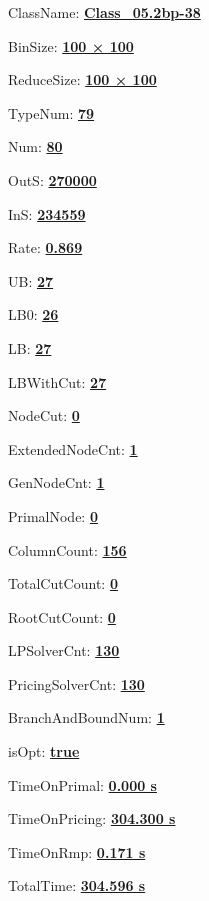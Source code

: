 \documentclass[11pt]{article}
\begin{document}
\pagestyle{empty}


ClassName: \underline{\textbf{Class_05.2bp-38}}
\par
BinSize: \underline{\textbf{100 × 100}}
\par
ReduceSize: \underline{\textbf{100 × 100}}
\par
TypeNum: \underline{\textbf{79}}
\par
Num: \underline{\textbf{80}}
\par
OutS: \underline{\textbf{270000}}
\par
InS: \underline{\textbf{234559}}
\par
Rate: \underline{\textbf{0.869}}
\par
UB: \underline{\textbf{27}}
\par
LB0: \underline{\textbf{26}}
\par
LB: \underline{\textbf{27}}
\par
LBWithCut: \underline{\textbf{27}}
\par
NodeCut: \underline{\textbf{0}}
\par
ExtendedNodeCnt: \underline{\textbf{1}}
\par
GenNodeCnt: \underline{\textbf{1}}
\par
PrimalNode: \underline{\textbf{0}}
\par
ColumnCount: \underline{\textbf{156}}
\par
TotalCutCount: \underline{\textbf{0}}
\par
RootCutCount: \underline{\textbf{0}}
\par
LPSolverCnt: \underline{\textbf{130}}
\par
PricingSolverCnt: \underline{\textbf{130}}
\par
BranchAndBoundNum: \underline{\textbf{1}}
\par
isOpt: \underline{\textbf{true}}
\par
TimeOnPrimal: \underline{\textbf{0.000 s}}
\par
TimeOnPricing: \underline{\textbf{304.300 s}}
\par
TimeOnRmp: \underline{\textbf{0.171 s}}
\par
TotalTime: \underline{\textbf{304.596 s}}
\par
\newpage


\end{document}
